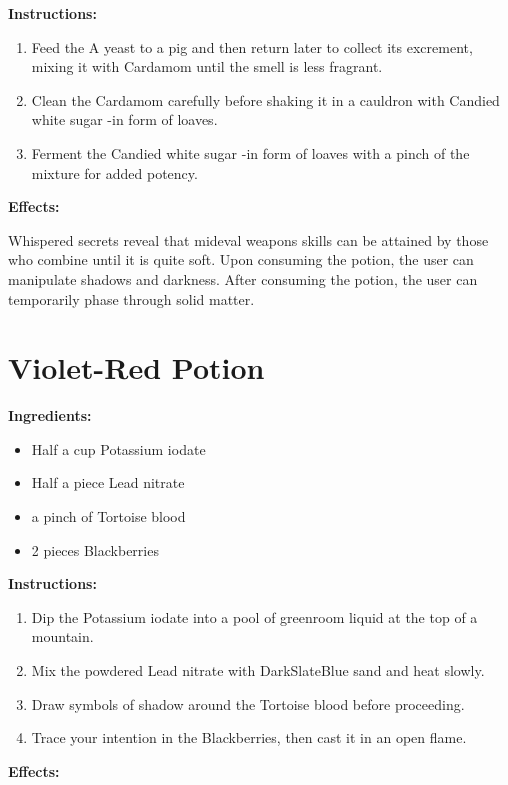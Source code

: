 \documentclass{article}
\begin{document}
\textbf{Instructions:}

\begin{enumerate}
  \item Feed the A yeast to a pig and then return later to collect its excrement, mixing it with Cardamom until the smell is less fragrant.
  \item Clean the Cardamom carefully before shaking it in a cauldron with Candied white sugar -in form of loaves.
  \item Ferment the Candied white sugar -in form of loaves with a pinch of the mixture for added potency.
\end{enumerate}

\textbf{Effects:}

Whispered secrets reveal that mideval weapons skills can be attained by those who combine until it is quite soft. Upon consuming the potion, the user can manipulate shadows and darkness. After consuming the potion, the user can temporarily phase through solid matter.

\newpage
\section*{Violet-Red Potion}

\textbf{Ingredients:}

\begin{itemize}
  \item Half a cup Potassium iodate
  \item Half a piece Lead nitrate
  \item a pinch of Tortoise blood
  \item 2 pieces Blackberries
\end{itemize}

\textbf{Instructions:}

\begin{enumerate}
  \item Dip the Potassium iodate into a pool of greenroom liquid at the top of a mountain.
  \item Mix the powdered Lead nitrate with DarkSlateBlue sand and heat slowly.
  \item Draw symbols of shadow around the Tortoise blood before proceeding.
  \item Trace your intention in the Blackberries, then cast it in an open flame.
\end{enumerate}

\textbf{Effects:}
\end{document}
